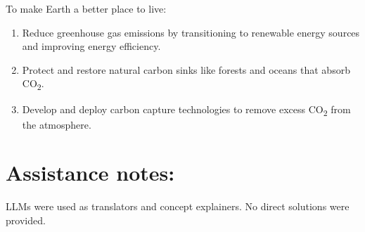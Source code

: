 \documentclass[11pt]{article}
\begin{document}
To make Earth a better place to live:
\begin{enumerate}
\item Reduce greenhouse gas emissions by transitioning to renewable energy sources and improving energy efficiency.
\item Protect and restore natural carbon sinks like forests and oceans that absorb CO\textsubscript{2}.
\item Develop and deploy carbon capture technologies to remove excess CO\textsubscript{2} from the atmosphere.
\end{enumerate}

\section*{Assistance notes:} LLMs were used as translators and concept explainers. No direct solutions were provided.
\end{document}
